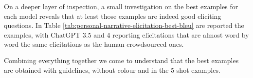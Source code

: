 
On a deeper layer of inspection, a small investigation on the best examples for each model reveals that at least those examples are indeed good eliciting questions. In Table \ref{tab:personal-narrative-elicitation-best-bleu} are reported the examples, with ChatGPT 3.5 and 4 reporting elicitations that are almost word by word the same elicitations as the human crowdsourced ones.

Combining everything together we come to understand that the best examples are obtained with guidelines, without colour and in the 5 shot examples. %